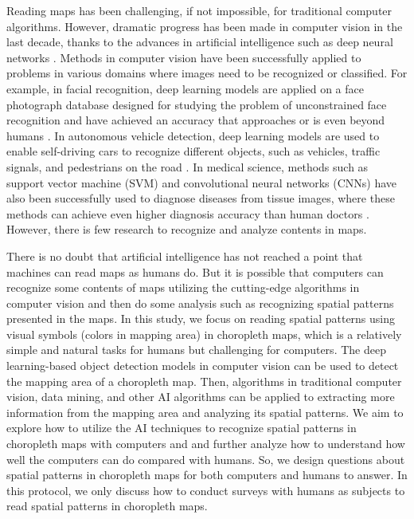 Reading maps has been challenging, if not impossible, for traditional computer algorithms. However, dramatic progress has been made in computer vision in the last decade, thanks to the advances in artificial intelligence such as deep neural networks \citep{Szeliski2021}. Methods in computer vision have been successfully applied to problems in various domains where images need to be recognized or classified. For example, in facial recognition, deep learning models are applied on a face photograph database designed for studying the problem of unconstrained face recognition and have achieved an accuracy that approaches or is even beyond humans \citep{Wang2021}. In autonomous vehicle detection, deep learning models are used to enable self-driving cars to recognize different objects, such as vehicles, traffic signals, and pedestrians on the road \citep{Sang2018,Wang2019}. In medical science, methods such as support vector machine (SVM) and convolutional neural networks (CNNs) have also been successfully used to diagnose diseases from tissue images, where these methods can achieve even higher diagnosis accuracy than human doctors \citep{Madabhushi2016}. However, there is few research to recognize and analyze contents in maps. 

There is no doubt that artificial intelligence has not reached a point that machines can read maps as humans do. But it is possible that computers can recognize some contents of maps utilizing the cutting-edge algorithms in computer vision and then do some analysis such as recognizing spatial patterns presented in the maps. In this study, we focus on reading spatial patterns using visual symbols (colors in mapping area) in choropleth maps, which is a relatively simple and natural tasks for humans but challenging for computers. The deep learning-based object detection models in computer vision can be used to detect the mapping area of a choropleth map. Then, algorithms in traditional computer vision, data mining, and other AI algorithms can be applied to extracting more information from the mapping area and analyzing its spatial patterns. We aim to explore how to utilize the AI techniques to recognize spatial patterns in choropleth maps with computers and and further analyze how to understand how well the computers can do compared with humans. So, we design questions about spatial patterns in choropleth maps for both computers and humans to answer. In this protocol, we only discuss how to conduct surveys with humans as subjects to read spatial patterns in choropleth maps.

